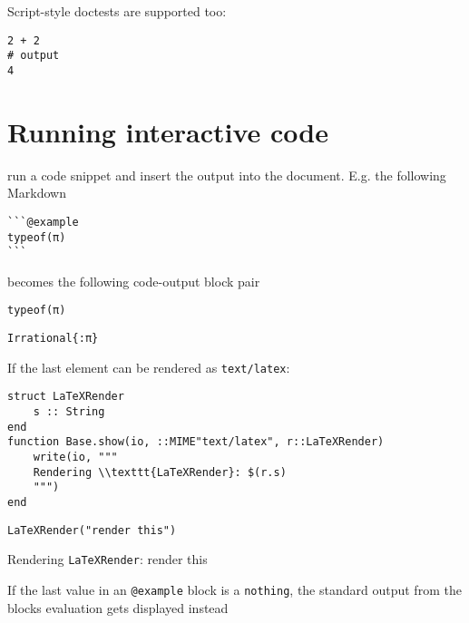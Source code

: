 Script-style doctests are supported too:




\begin{verbatim}
2 + 2
# output
4
\end{verbatim}



\section{Running interactive code}



\label{3545462789522369084}{}


 run a code snippet and insert the output into the document. E.g. the following Markdown




\begin{verbatim}
```@example
typeof(π)
```
\end{verbatim}



becomes the following code-output block pair




\begin{verbatim}
typeof(π)
\end{verbatim}


\begin{verbatim}
Irrational{:π}
\end{verbatim}



If the last element can be rendered as \texttt{text/latex}:




\begin{verbatim}
struct LaTeXRender
    s :: String
end
function Base.show(io, ::MIME"text/latex", r::LaTeXRender)
    write(io, """
    Rendering \\texttt{LaTeXRender}: $(r.s)
    """)
end
\end{verbatim}




\begin{verbatim}
LaTeXRender("render this")
\end{verbatim}

Rendering \texttt{LaTeXRender}: render this


If the last value in an \texttt{@example} block is a \texttt{nothing}, the standard output from the blocks{\textquotesingle} evaluation gets displayed instead




